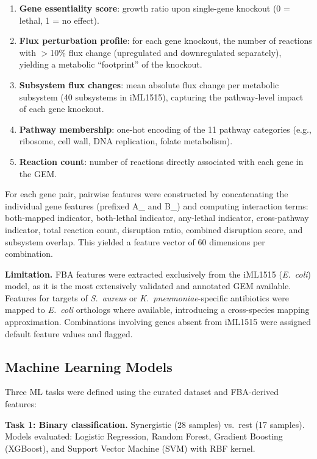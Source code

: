 \documentclass[12pt,a4paper]{article}
\begin{document}
\begin{enumerate}
    \item \textbf{Gene essentiality score}: growth ratio upon single-gene knockout (0 = lethal, 1 = no effect).
    \item \textbf{Flux perturbation profile}: for each gene knockout, the number of reactions with $>$10\% flux change (upregulated and downregulated separately), yielding a metabolic ``footprint'' of the knockout.
    \item \textbf{Subsystem flux changes}: mean absolute flux change per metabolic subsystem (40 subsystems in iML1515), capturing the pathway-level impact of each gene knockout.
    \item \textbf{Pathway membership}: one-hot encoding of the 11 pathway categories (e.g., ribosome, cell wall, DNA replication, folate metabolism).
    \item \textbf{Reaction count}: number of reactions directly associated with each gene in the GEM.
\end{enumerate}

For each gene pair, pairwise features were constructed by concatenating the individual gene features (prefixed A\_ and B\_) and computing interaction terms: both-mapped indicator, both-lethal indicator, any-lethal indicator, cross-pathway indicator, total reaction count, disruption ratio, combined disruption score, and subsystem overlap. This yielded a feature vector of 60 dimensions per combination.

\textbf{Limitation.} FBA features were extracted exclusively from the iML1515 (\textit{E.\ coli}) model, as it is the most extensively validated and annotated GEM available. Features for targets of \textit{S.\ aureus} or \textit{K.\ pneumoniae}-specific antibiotics were mapped to \textit{E.\ coli} orthologs where available, introducing a cross-species mapping approximation. Combinations involving genes absent from iML1515 were assigned default feature values and flagged.

\subsection{Machine Learning Models}

Three ML tasks were defined using the curated dataset and FBA-derived features:

\textbf{Task 1: Binary classification.} Synergistic (28 samples) vs.\ rest (17 samples). Models evaluated: Logistic Regression, Random Forest, Gradient Boosting (XGBoost), and Support Vector Machine (SVM) with RBF kernel.
\end{document}
